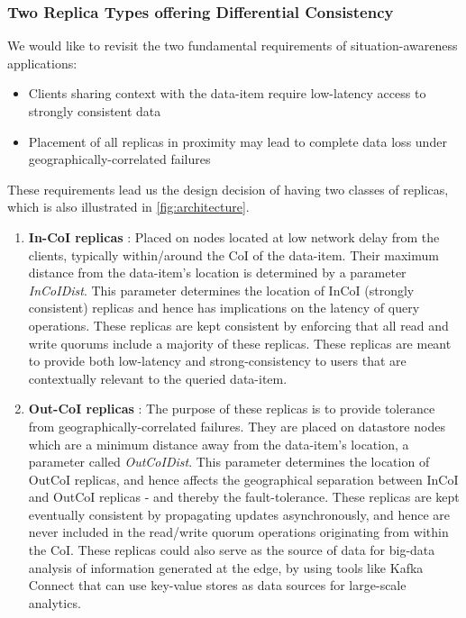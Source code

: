 \subsubsection{Two Replica Types offering Differential Consistency}
\label{sec:two_replica_types}
We would like to revisit the two fundamental requirements of situation-awareness applications:
\begin{itemize}
\item Clients sharing context with the data-item require low-latency access to strongly consistent data
\item Placement of all replicas in proximity may lead to complete data loss under geographically-correlated failures
\end{itemize}

These requirements lead us the design decision of having two classes of replicas, which is also illustrated in \cref{fig:architecture}.
\begin{enumerate}
\item \textbf{In-CoI replicas} : Placed on nodes located at low network delay from the clients, typically within/around the CoI of the data-item.  Their maximum distance from the data-item's location is determined by a parameter \emph{InCoIDist}. This parameter determines the location of InCoI (strongly consistent) replicas and hence has implications on the latency of query operations. These replicas are kept consistent by enforcing that all read and write quorums include a majority of these replicas. These replicas are meant to provide both low-latency and strong-consistency to users that are contextually relevant to the queried data-item.
\item \textbf{Out-CoI replicas} : The purpose of these replicas is to provide tolerance from geographically-correlated failures. They are placed on datastore nodes which are a minimum distance away from the data-item's location, a parameter called \emph{OutCoIDist}. This parameter determines the location of OutCoI replicas, and hence affects the geographical separation between InCoI and OutCoI replicas - and thereby the fault-tolerance. These replicas are kept eventually consistent by propagating updates asynchronously, and hence are never included in the read/write quorum operations originating from within the CoI. These replicas could also serve as the source of data for big-data analysis of information generated at the edge, by using tools like Kafka Connect \cite{kafkaconnect} that can use key-value stores as data sources for large-scale analytics.
\end{enumerate}

